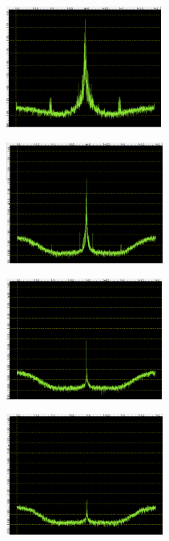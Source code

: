\documentclass[journal]{IEEEtran}
\begin{document}
\begin{figure}
\centering

\begin{subfigure}[b]{0.45\textwidth}
   \includegraphics[width=1\linewidth, height=4cm]{fig/loopback_near.PNG}
   \caption{}
   \label{fig:lnear}
\end{subfigure}

\begin{subfigure}[b]{0.45\textwidth}
   \includegraphics[width=1\linewidth, height=4cm]{fig/loopback_far.PNG}
   \caption{}
   \label{fig:lfar}
\end{subfigure}

\begin{subfigure}[b]{0.45\textwidth}
   \includegraphics[width=1\linewidth, height=4cm]{fig/loopback_18m_far.PNG}
   \caption{}
   \label{fig:l18far}
\end{subfigure}

\begin{subfigure}[b]{0.45\textwidth}
   \includegraphics[width=1\linewidth, height=4cm]{fig/loopback_50m_far.PNG}
   \caption{}
   \label{fig:l50far}
\end{subfigure}


\end{figure}
\end{document}
